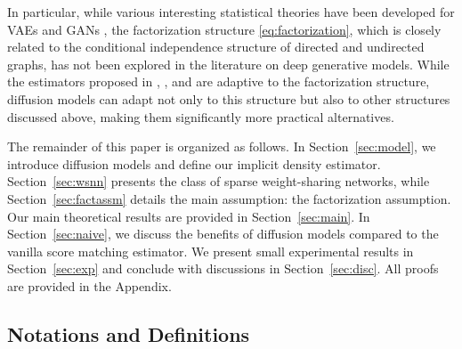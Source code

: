 \documentclass[twoside,11pt]{article}
\begin{document}
In particular, while various interesting statistical theories have been developed for VAEs \citep{kwon2024minimax, chae2023likelihood} and GANs \citep{liang2021well, uppal2019nonparametric, chae2022convergence, stephanovitch2024wasserstein, tang2023minimax, puchkin2024rates}, the factorization structure \eqref{eq:factorization}, which is closely related to the conditional independence structure of directed and undirected graphs, has not been explored in the literature on deep generative models.
While the estimators proposed in \citet{bos2024supervised}, \citet{vandermeulen2024breaking}, and \cite{vandermeulen2024dimension} are adaptive to the factorization structure, diffusion models can adapt not only to this structure but also to other structures discussed above, making them significantly more practical alternatives.


The remainder of this paper is organized as follows. In Section~\ref{sec:model}, we introduce diffusion models and define our implicit density estimator. Section~\ref{sec:wsnn} presents the class of sparse weight-sharing networks, while Section~\ref{sec:factassm} details the main assumption: the factorization assumption. Our main theoretical results are provided in Section~\ref{sec:main}.
In Section~\ref{sec:naive}, we discuss the benefits of diffusion models compared to the vanilla score matching estimator. We present small experimental results in Section~\ref{sec:exp} and conclude with discussions in Section~\ref{sec:disc}.
All proofs are provided in the Appendix.


\subsection{Notations and Definitions}
\label{sec:not}
\end{document}
